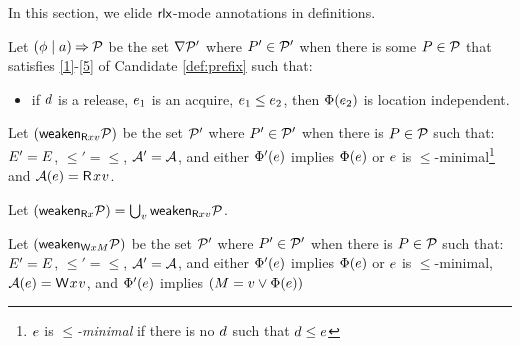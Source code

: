 In this section, we elide
${\mathsf{rlx}}$-mode annotations in definitions.
\begin{definition}
  \label{def:cover}
  Let $(\phi \mid a) \mathbin\Rightarrow \mathcal{P}$ be the set $\nabla \mathcal{P}'$ %
  where $P'\in\mathcal{P}'$ when there is some $P\in\mathcal{P}$ that satisfies
  \ref{1}-\ref{5} of Candidate \ref{def:prefix} such that:
  \begin{itemize}
  \item[{\labeltextsc[P6]{(P6)}{6}}]
    if $d$ is a release, $e_1$ is an acquire, $e_1\le e_2$, then $\Phi(e_2)$
    is location independent.
  \end{itemize}  

  Let $(\mathsf{weaken}_{\mathsf{R}xv}\mathcal{P})$ be the set $\mathcal{P}'$ where $P'\in\mathcal{P}'$
  when there is $P\in\mathcal{P}$ such that: $E' = E$,
  ${\le'} = {\le}$, $\mathcal{A}' = \mathcal{A}$, and either
  $\Phi'(e)$ implies $\Phi(e)$ or $e$ is
  $\le$-minimal\footnote{$e$ is \emph{$\le$-minimal} if there is no $d$
    such that $d\le e$} and
  $\labelingAct(\aEv)=\DR[\modeRLXquiet]{\aLoc}{\aVal}$.

  Let $(\mathsf{weaken}_{\mathsf{R}x}\mathcal{P}) = \textstyle\bigcup_v \mathsf{weaken}_{\mathsf{R}xv}\mathcal{P}$.

  Let $(\mathsf{weaken}_{\mathsf{W}xM}\mathcal{P})$ be the set $\mathcal{P}'$ where $P'\in\mathcal{P}'$
  when there is $P\in\mathcal{P}$ such that: $E' = E$, ${\le'} = {\le}$,
  $\mathcal{A}' = \mathcal{A}$, 
  and either
  $\Phi'(e)$ implies $\Phi(e)$ or $e$ is
  $\le$-minimal,
  $\labelingAct(\aEv)=\DW[\modeRLXquiet]{\aLoc}{\aVal}$, and
  $\Phi'(e)$ implies $(M=v\lor\Phi(e))$
  

\end{definition}

